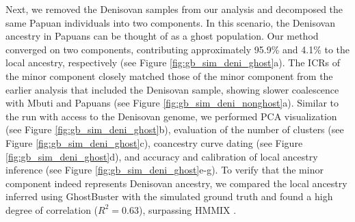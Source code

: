 Next, we removed the Denisovan samples from our analysis and decomposed the same Papuan individuals into two components. In this scenario, the Denisovan ancestry in Papuans can be thought of as a ghost population. Our method converged on two components, contributing approximately 95.9\% and 4.1\% to the local ancestry, respectively (see Figure \ref{fig:gb_sim_deni_ghost}a). The ICRs of the minor component closely matched those of the minor component from the earlier analysis that included the Denisovan sample, showing slower coalescence with Mbuti and Papuans (see Figure \ref{fig:gb_sim_deni_nonghost}a). Similar to the run with access to the Denisovan genome, we performed PCA visualization (see Figure \ref{fig:gb_sim_deni_ghost}b), evaluation of the number of clusters (see Figure \ref{fig:gb_sim_deni_ghost}c), coancestry curve dating (see Figure \ref{fig:gb_sim_deni_ghost}d), and accuracy and calibration of local ancestry inference (see Figure \ref{fig:gb_sim_deni_ghost}e-g). To verify that the minor component indeed represents Denisovan ancestry, we compared the local ancestry inferred using GhostBuster with the simulated ground truth and found a high degree of correlation ($R^2 = 0.63$), surpassing HMMIX \cite{skov2018detecting}.

